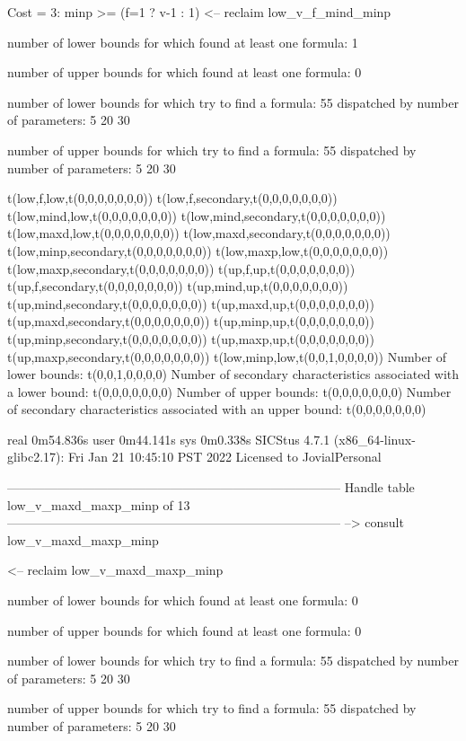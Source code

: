 Cost =  3:  minp >= (f=1 ? v-1 : 1)
<-- reclaim low_v_f_mind_minp

number of lower bounds for which found at least one formula: 1

number of upper bounds for which found at least one formula: 0

number of lower bounds for which try to find a formula: 55
dispatched by number of parameters: 5  20  30

number of upper bounds for which try to find a formula: 55
dispatched by number of parameters: 5  20  30

t(low,f,low,t(0,0,0,0,0,0,0))
t(low,f,secondary,t(0,0,0,0,0,0,0))
t(low,mind,low,t(0,0,0,0,0,0,0))
t(low,mind,secondary,t(0,0,0,0,0,0,0))
t(low,maxd,low,t(0,0,0,0,0,0,0))
t(low,maxd,secondary,t(0,0,0,0,0,0,0))
t(low,minp,secondary,t(0,0,0,0,0,0,0))
t(low,maxp,low,t(0,0,0,0,0,0,0))
t(low,maxp,secondary,t(0,0,0,0,0,0,0))
t(up,f,up,t(0,0,0,0,0,0,0))
t(up,f,secondary,t(0,0,0,0,0,0,0))
t(up,mind,up,t(0,0,0,0,0,0,0))
t(up,mind,secondary,t(0,0,0,0,0,0,0))
t(up,maxd,up,t(0,0,0,0,0,0,0))
t(up,maxd,secondary,t(0,0,0,0,0,0,0))
t(up,minp,up,t(0,0,0,0,0,0,0))
t(up,minp,secondary,t(0,0,0,0,0,0,0))
t(up,maxp,up,t(0,0,0,0,0,0,0))
t(up,maxp,secondary,t(0,0,0,0,0,0,0))
t(low,minp,low,t(0,0,1,0,0,0,0))
Number of lower bounds:                                             t(0,0,1,0,0,0,0)
Number of secondary characteristics associated with a lower bound:  t(0,0,0,0,0,0,0)
Number of upper bounds:                                             t(0,0,0,0,0,0,0)
Number of secondary characteristics associated with an upper bound: t(0,0,0,0,0,0,0)

real	0m54.836s
user	0m44.141s
sys	0m0.338s
SICStus 4.7.1 (x86_64-linux-glibc2.17): Fri Jan 21 10:45:10 PST 2022
Licensed to JovialPersonal


--------------------------------------------------------------------------------
Handle table low_v_maxd_maxp_minp of 13
--------------------------------------------------------------------------------
--> consult low_v_maxd_maxp_minp

<-- reclaim low_v_maxd_maxp_minp

number of lower bounds for which found at least one formula: 0

number of upper bounds for which found at least one formula: 0

number of lower bounds for which try to find a formula: 55
dispatched by number of parameters: 5  20  30

number of upper bounds for which try to find a formula: 55
dispatched by number of parameters: 5  20  30

